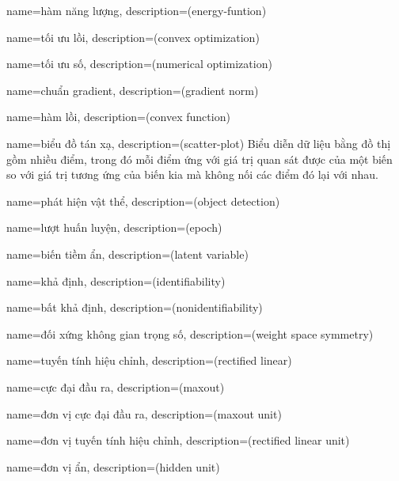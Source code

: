 {
    name={hàm năng lượng},
    description={(energy-funtion)}
}

{
    name={tối ưu lồi},
    description={(convex optimization)}
}

{
    name={tối ưu số},
    description={(numerical optimization)}
}

{
    name={chuẩn gradient},
    description={(gradient norm)}
}

{
    name={hàm lồi},
    description={(convex function)}
}

{
    name={biểu đồ tán xạ},
    description={(scatter-plot) Biểu diễn dữ liệu bằng
    đồ thị gồm nhiều điểm, trong đó mỗi điểm ứng với
    giá trị quan sát được của một biến so với giá trị
    tương ứng của biến kia mà không nối các điểm đó
    lại với nhau.}
}

{
    name={phát hiện vật thể},
    description={(object detection)}
}

{
    name={lượt huấn luyện},
    description={(epoch)}
}

{
    name={biến tiềm ẩn},
    description={(latent variable)}
}

{
    name={khả định},
    description={(identifiability)}
}

{
    name={bất khả định},
    description={(nonidentifiability)}
}

{
    name={đối xứng không gian trọng số},
    description={(weight space symmetry)}
}

{
    name={tuyến tính hiệu chỉnh},
    description={(rectified linear)}
}

{
    name={cực đại đầu ra},
    description={(maxout)}
}

{
    name={đơn vị cực đại đầu ra},
    description={(maxout unit)}
}

{
    name={đơn vị tuyến tính hiệu chỉnh},
    description={(rectified linear unit)}
}

{
    name={đơn vị ẩn},
    description={(hidden unit)}
}

